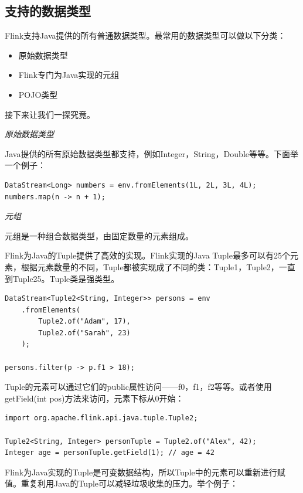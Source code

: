 \documentclass[cn,11pt,chinese]{elegantbook}
\begin{document}
\subsection{支持的数据类型}

Flink支持Java提供的所有普通数据类型。最常用的数据类型可以做以下分类：

\begin{itemize}
    \item 原始数据类型
    \item Flink专门为Java实现的元组
    \item POJO类型
\end{itemize}

接下来让我们一探究竟。

\textit{原始数据类型}

Java提供的所有原始数据类型都支持，例如Integer，String，Double等等。下面举一个例子：

\begin{verbatim}
DataStream<Long> numbers = env.fromElements(1L, 2L, 3L, 4L);
numbers.map(n -> n + 1);
\end{verbatim}

\textit{元组}

元组是一种组合数据类型，由固定数量的元素组成。

Flink为Java的Tuple提供了高效的实现。Flink实现的Java Tuple最多可以有25个元素，根据元素数量的不同，Tuple都被实现成了不同的类：Tuple1，Tuple2，一直到Tuple25。Tuple类是强类型。

\begin{verbatim}
DataStream<Tuple2<String, Integer>> persons = env
    .fromElements(
        Tuple2.of("Adam", 17),
        Tuple2.of("Sarah", 23)
    );

persons.filter(p -> p.f1 > 18);
\end{verbatim}

Tuple的元素可以通过它们的public属性访问——f0，f1，f2等等。或者使用getField(int pos)方法来访问，元素下标从0开始：

\begin{verbatim}
import org.apache.flink.api.java.tuple.Tuple2;

Tuple2<String, Integer> personTuple = Tuple2.of("Alex", 42);
Integer age = personTuple.getField(1); // age = 42
\end{verbatim}

Flink为Java实现的Tuple是可变数据结构，所以Tuple中的元素可以重新进行赋值。重复利用Java的Tuple可以减轻垃圾收集的压力。举个例子：
\end{document}
